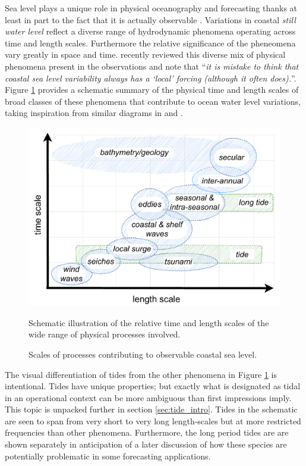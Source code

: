 Sea level plays a unique role in physical oceanography and forecasting thanks at least in part to the fact that it is actually observable \citep{Wilson:2010hy}. 
Variations in coastal \emph{still water level} \citep{Pugh:2014di} reflect a diverse range of hydrodynamic phenomena operating across time and length scales.   Furthermore the relative significance of the pheneomena vary greatly in space and time.
\citet{10.1007/s10712-019-09531-1} recently reviewed this diverse mix of physical phenomena present in the observations and note that ``\textit{it is mistake to think that coastal sea level variability always has a ‘local’ forcing (although it often does).}''. 
Figure \ref{fig:sealevelScales} provides a schematic summary of the physical time and length scales of broad classes of these phenomena that contribute to ocean water level variations, taking inspiration from similar diagrams in \citet{10.1007/s10712-019-09531-1} and \citet{Chelton:2001ws}.
\begin{figure}[!hbt]\centering
  \includegraphics[width=\figwidthFull]{figures/diagrams/scales_time_length.pdf}
  \caption{Scales of processes contributing to observable coastal sea level.}{Schematic illustration of the relative time and length scales of the wide range of physical processes involved.}
  \label{fig:sealevelScales}
\end{figure}
The visual differentiation of tides from the other phenomena in Figure \ref{fig:sealevelScales} is intentional.  Tides have unique properties; but exactly what is designated as tidal in an operational context can be more ambiguous than first impressions imply. This topic is unpacked further in section \ref{sec:tide_intro}. Tides in the schematic are seen to span from very short to very long length-scales but at more restricted frequencies than other phenomena.    Furthermore, the long period tides are are shown separately in anticipation of a later discussion of how these species are potentially problematic in some forecasting applications.

